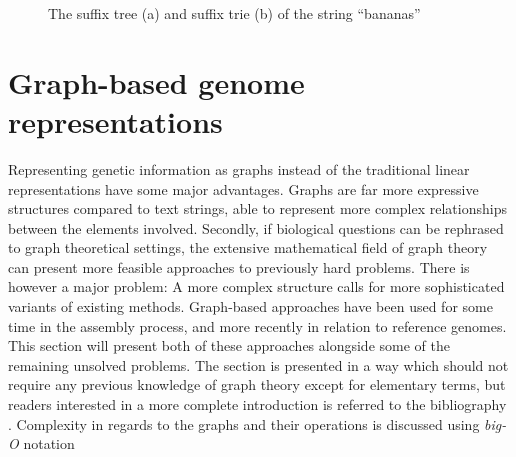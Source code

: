 \documentclass[thesis.tex]{subfiles}
\begin{document}
\begin{figure}[hb]
\begin{minipage}[t]{0.49\textwidth}
\begin{subfigure}[t]{\textwidth}
\begin{mdframed}
\begin{center}
      \end{center}
    \end{mdframed}
    \caption{}
    \label{fig:suffix_tree}
  \end{subfigure}
  \begin{minipage}[t]{0.49\textwidth}
    \caption{The suffix tree (a) and suffix trie  (b) of the string ``bananas''}
  \end{minipage}
  \end{minipage}
  \label{fig:suffix_trees}
\end{figure}
\clearpage
\section{Graph-based genome representations}
Representing genetic information as graphs instead of the traditional linear representations have some major advantages. Graphs are far more expressive structures compared to text strings, able to represent more complex relationships between the elements involved. Secondly, if biological questions can be rephrased to graph theoretical settings, the extensive mathematical field of graph theory can present more feasible approaches to previously hard problems. There is however a major problem: A more complex structure calls for more sophisticated variants of existing methods. Graph-based approaches have been used for some time in the assembly process, and more recently in relation to reference genomes. This section will present both of these approaches alongside some of the remaining unsolved problems. The section is presented in a way which should not require any previous knowledge of graph theory except for elementary terms, but readers interested in a more complete introduction is referred to the bibliography \cite[Chapter 0]{introduction_to_the_theory_of_computation} \cite[Chapter 9]{data_structures_and_algorithm_analysis_in_java} \cite[Chapter 11]{algorithms_sequential_parallell_and_distributed}. Complexity in regards to the graphs and their operations is discussed using \textit{big-O} notation \cite[Chapter 2]{data_structures_and_algorithm_analysis_in_java}\cite[Section 3.1]{algorithms_sequential_parallell_and_distributed}
\end{document}

